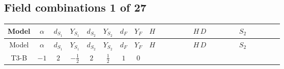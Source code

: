 \documentclass[8pt]{article}
\begin{document}
\begin{landscape}
\subsection*{Field combinations 1 of 27}
\begin{longtable}{@{}cccccccc >{\raggedright\arraybackslash}p{0.21\linewidth} >{\raggedright\arraybackslash}p{0.21\linewidth} >{\raggedright\arraybackslash}p{0.21\linewidth}@{}}
\toprule
Model & $\alpha$ & $d_{S_1}$ & $Y_{S_1}$ & $d_{S_2}$ & $Y_{S_2}$ & $d_F$ & $Y_F$ & $H$ & $H\,D$ & $S_2$ \\
\midrule
\endfirsthead
\toprule
Model & $\alpha$ & $d_{S_1}$ & $Y_{S_1}$ & $d_{S_2}$ & $Y_{S_2}$ & $d_F$ & $Y_F$ & $H$ & $H\,D$ & $S_2$ \\
\midrule
\endhead
T3-B & $-1$ & $2$ & $-\frac{1}{2}$ & $2$ & $\frac{1}{2}$ & $1$ & $0$ & \scriptsize\adjustbox{max width=\linewidth}{$\begin{gathered} -\frac{\hbar  C_{\text{H2}} H_{a_1} H_{a_2} H_{a_1}{}^{\dagger } H_{a_2}{}^{\dagger } g_2^4}{240 m_1^2} \\ +\frac{\lambda  \hbar  H_{a_1} H_{a_2} H_{a_3} H_{a_1}{}^{\dagger } H_{a_2}{}^{\dagger } H_{a_3}{}^{\dagger } g_2^4}{240 m_1^2} \\ +C_{\text{H2}} H_{a_1} H_{a_1}{}^{\dagger }\end{gathered}$} & \scriptsize\adjustbox{max width=\linewidth}{$\begin{gathered} -\frac{\hbar  H_{a_2} H_{a_2}{}^{\dagger } D_{\mu _1}\left(H_{a_1}\right){}^{\dagger } D_{\mu _1}\left(H_{a_1}\right) g_2^4}{80 m_1^2} \\ +\frac{4 \hbar  \overline{\lambda_5} H_{a_2} \lambda_5 H_{a_2}{}^{\dagger } D_{\mu _1}\left(H_{a_1}\right){}^{\dagger } D_{\mu _1}\left(H_{a_1}\right)}{3 m_1^2} \\ -\frac{\hbar  g_1^4 H_{a_2} H_{a_2}{}^{\dagger } D_{\mu _1}\left(H_{a_1}\right){}^{\dagger } D_{\mu _1}\left(H_{a_1}\right)}{240 m_1^2}\end{gathered}$} & \scriptsize\adjustbox{max width=\linewidth}{$\begin{gathered} -\frac{C_{S_2^\dagger S_2} \hbar  S_{2,j_1} S_{2,j_2} S_{2,j_1}{}^{\dagger } S_{2,j_2}{}^{\dagger } g_2^4}{240 m_1^2} \\ -\frac{\hbar  S_{2,j_3} S_{2,j_4} S_{2,j_5} S_{2,j_1}{}^{\dagger } S_{2,j_2}{}^{\dagger } S_{2,j_3}{}^{\dagger } \mathcal{I}_{S_2,j_2,j_4,j_1,j_5}{}^1 \lambda_{S_2}^{(1)}^{(1)} g_2^4}{240 m_1^2} \\ +\frac{\hbar  S_{2,j_1} S_{2,j_2} S_{2,j_3} S_{2,j_1}{}^{\dagger } S_{2,j_2}{}^{\dagger } S_{2,j_3}{}^{\dagger } \left(\lambda_{12}^{(1)}^{(1)}\right){}^3}{6 m_1^2}\end{gathered}$} \\

\end{longtable}
\end{landscape}
\end{document}
